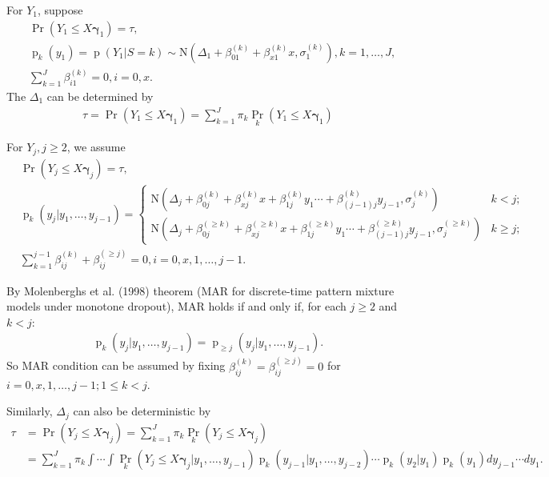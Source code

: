 \documentclass[12pt]{article}
\DeclareMathOperator{\pr}{p}
\DeclareMathOperator{\prob}{Pr}
\begin{document}
For $Y_1$, suppose
\begin{align*}
  & \prob (Y_1 \leq X \bm \gamma_1 )  = \tau ,\\
  & \pr_k(y_1) = \pr(Y_1|S = k)  \sim \textrm{N} (\Delta_1 + \beta_{01}^{(k)} + \beta_{x1}^{(k)}x, \sigma_1^{(k)}), k = 1, \ldots, J,\\
  & \sum_{k=1}^J \beta_{i1}^{(k)} = 0, i = 0, x.
\end{align*}
The $\Delta_1$ can be determined by
\begin{align*}
  \tau = \prob (Y_1 \leq X \bm \gamma_1 ) = \sum_{k=1}^J \pi_k\prob_k (Y_1 \leq X \bm \gamma_1 )
\end{align*}

For $Y_j, j \geq 2$, we assume
\begin{align*}
  &  \prob (Y_j \leq X \bm \gamma_j )  = \tau ,\\
  & \pr_k(y_j|y_1, \ldots, y_{j-1}) =
  \begin{cases}
    \textrm{N} (\Delta_j + \beta_{0j}^{(k)} + \beta_{xj}^{(k)}x + \beta_{1j}^{(k)}y_1 \cdots
    + \beta_{(j-1)j}^{(k)}y_{j-1}, \sigma_j^{(k)}) & k < j ; \\
    \textrm{N} (\Delta_j + \beta_{0j}^{(\geq k)} + \beta_{xj}^{(\geq k)}x +
    \beta_{1j}^{(\geq k)}y_1 \cdots + \beta_{(j-1)j}^{(\geq
      k)}y_{j-1}, \sigma_j^{(\geq k)}) & k \geq j ;
  \end{cases} \\
  & \sum_{k=1}^{j-1} \beta_{ij}^{(k)} + \beta_{ij}^{(\geq j)} = 0, i = 0, x, 1, \ldots ,
  j-1.
\end{align*}

By Molenberghs et al. (1998) theorem (MAR for discrete-time pattern
mixture models under monotone dropout), MAR holds if and only if, for
each $j \geq 2$ and $k < j$:
\begin{align*}
  \pr_k(y_j|y_1, \ldots, y_{j-1}) = \pr_{\geq j}(y_j|y_1, \ldots, y_{j-1})
  .
\end{align*}
So MAR condition can be assumed by fixing $\beta_{ij}^{(k)} =
\beta_{ij}^{(\geq j)} = 0$ for $i = 0, x, 1, \ldots, j-1; 1 \leq k < j$.

Similarly, $\Delta_j$ can also be deterministic by
\begin{align*}
  \tau &= \prob (Y_j \leq X \bm \gamma_j ) = \sum_{k=1}^J \pi_k\prob_k (Y_j \leq X \bm \gamma_j ) \\
  & = \sum_{k=1}^J \pi_k \int\cdots \int \prob_k (Y_j \leq X \bm \gamma_j |y_1,\ldots, y_{j-1})
  \pr_k (y_{j-1}| y_1, \ldots, y_{j-2}) \cdots\pr_k (y_{2}| y_1) \pr_k(y_1)
  dy_{j-1}\cdots dy_1.
\end{align*}
\end{document}
